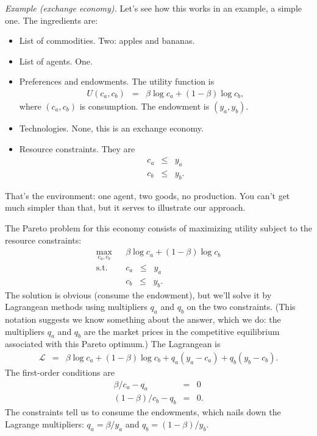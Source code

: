 \documentclass[11pt]{article}
\begin{document}
{\it Example (exchange economy).\/}
Let's see how this works in an example, a simple one.
The ingredients are:
%
\begin{itemize}
\item List of commodities.   Two:  apples and bananas.
\item List of agents.  One.
\item Preferences and endowments.  The utility function is
\begin{eqnarray*}
    U(c_a,c_b) &=& \beta \log c_a + (1-\beta) \log c_b ,
\end{eqnarray*}
where $(c_a,c_b)$ is consumption.
The endowment is $(y_a,y_b)$.
\item Technologies.  None, this is an exchange economy.
\item Resource constraints.  They are
\begin{eqnarray*}
    c_a &\leq& y_a \\
    c_b &\leq& y_b .
\end{eqnarray*}
\end{itemize}
That's the environment:  one agent, two goods, no production.
You can't get much simpler than that,
but it serves to illustrate our approach.

The Pareto problem for this economy consists of maximizing utility subject
to the resource constraints:
\begin{eqnarray*}
    \max_{c_a,c_b} &&  \beta \log c_a + (1-\beta) \log c_b \\
    \mbox{s.t.}   &&  c_a \;\;\leq\;\; y_a \\
                  &&  c_b \;\;\leq\;\; y_b .
\end{eqnarray*}
The solution is obvious (consume the endowment),
but we'll solve it by Lagrangean methods using
multipliers $q_a$ and $q_b$ on the two constraints.
(This notation suggests we know something about the answer,
which we do:  the multipliers $q_a$ and $q_b$ are the market prices
in the competitive equilibrium associated with this Pareto optimum.)
The Lagrangean is
\begin{eqnarray*}
    \mathcal{L} &=&  \beta \log c_a + (1-\beta) \log c_b
                + q_a (y_a - c_a) + q_b (y_b - c_b) .
\end{eqnarray*}
The first-order conditions are
\begin{eqnarray*}
    \beta/c_a - q_a &=& 0 \\
   (1-\beta)/c_b - q_b &=& 0 .
\end{eqnarray*}
The constraints tell us to consume the endowments, 
which nails down the Lagrange multipliers:
$ q_a = \beta /y_a$ and $q_b = (1-\beta)/ y_b$.
\end{document}
